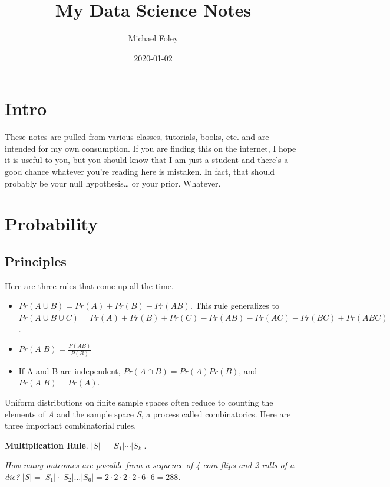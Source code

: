 \documentclass[]{book}
\title{My Data Science Notes}
\author{Michael Foley}
\date{2020-01-02}
\begin{document}
\maketitle

{
\setcounter{tocdepth}{1}
\tableofcontents
}
\hypertarget{intro}{%
\chapter*{Intro}\label{intro}}

These notes are pulled from various classes, tutorials, books, etc. and are intended for my own consumption. If you are finding this on the internet, I hope it is useful to you, but you should know that I am just a student and there's a good chance whatever you're reading here is mistaken. In fact, that should probably be your null hypothesis\ldots{} or your prior. Whatever.

\hypertarget{probability}{%
\chapter{Probability}\label{probability}}

\hypertarget{principles}{%
\section{Principles}\label{principles}}

Here are three rules that come up all the time.

\begin{itemize}
\item
  \(Pr(A \cup B) = Pr(A)+Pr(B) - Pr(AB)\). This rule generalizes to
  \(Pr(A \cup B \cup C)=Pr(A)+Pr(B)+Pr(C)-Pr(AB)-Pr(AC)-Pr(BC)+Pr(ABC)\).
\item
  \(Pr(A|B) = \frac{P(AB)}{P(B)}\)
\item
  If A and B are independent, \(Pr(A \cap B) = Pr(A)Pr(B)\), and \(Pr(A|B)=Pr(A)\).
\end{itemize}

Uniform distributions on finite sample spaces often reduce to counting the elements of \emph{A} and the sample space \emph{S}, a process called combinatorics. Here are three important combinatorial rules.

\textbf{Multiplication Rule}. \(|S|=|S_1 |⋯|S_k|\).

\emph{How many outcomes are possible from a sequence of 4 coin flips and 2 rolls of a die?}
\(|S|=|S_1| \cdot |S_2| \dots |S_6| = 2 \cdot 2 \cdot 2 \cdot 2 \cdot 6 \cdot 6 = 288\).
\end{document}
